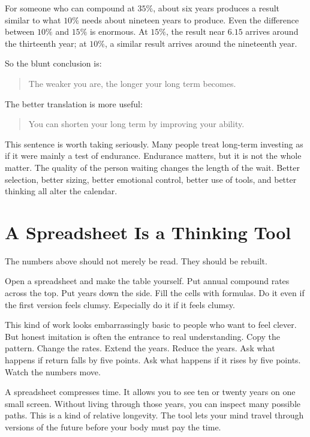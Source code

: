 For someone who can compound at \(35\%\), about six years produces a result similar to what \(10\%\) needs about nineteen years to produce. Even the difference between \(10\%\) and \(15\%\) is enormous. At \(15\%\), the result near \(6.15\) arrives around the thirteenth year; at \(10\%\), a similar result arrives around the nineteenth year.

So the blunt conclusion is:

\begin{quote}
The weaker you are, the longer your long term becomes.
\end{quote}

The better translation is more useful:

\begin{quote}
You can shorten your long term by improving your ability.
\end{quote}

This sentence is worth taking seriously. Many people treat long-term investing as if it were mainly a test of endurance. Endurance matters, but it is not the whole matter. The quality of the person waiting changes the length of the wait. Better selection, better sizing, better emotional control, better use of tools, and better thinking all alter the calendar.

\section*{A Spreadsheet Is a Thinking Tool}

The numbers above should not merely be read. They should be rebuilt.

Open a spreadsheet and make the table yourself. Put annual compound rates across the top. Put years down the side. Fill the cells with formulas. Do it even if the first version feels clumsy. Especially do it if it feels clumsy.

This kind of work looks embarrassingly basic to people who want to feel clever. But honest imitation is often the entrance to real understanding. Copy the pattern. Change the rates. Extend the years. Reduce the years. Ask what happens if return falls by five points. Ask what happens if it rises by five points. Watch the numbers move.

A spreadsheet compresses time. It allows you to see ten or twenty years on one small screen. Without living through those years, you can inspect many possible paths. This is a kind of relative longevity. The tool lets your mind travel through versions of the future before your body must pay the time.

